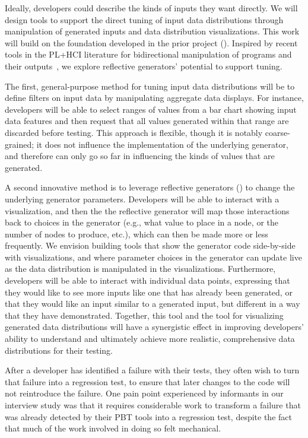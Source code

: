Ideally,
developers could describe the kinds of inputs they want directly.
We will design tools to support the direct tuning of input data distributions
through manipulation of generated inputs and data distribution visualizations. This
work will build on the foundation developed in the prior project
(). Inspired by recent tools in the PL+HCI literature
for bidirectional manipulation of programs and their
outputs~\cite{ref:hempel2019sketch,ref:kery2020mage,ref:omar2012active,ref:omar2021filling},
we explore reflective generators' potential to support tuning.

The first, general-purpose method for tuning input data distributions will be to
define filters on input data by manipulating aggregate data displays.
For instance, developers will be able to select ranges of values from a bar
chart showing input data features and then request that all values generated
within that range are discarded before testing. This approach is flexible,
though it is notably coarse-grained;
it does not influence the implementation of the underlying generator, and
therefore can only go so far in influencing the kinds of values that are
generated.

A second innovative method is to leverage
reflective generators () to change the underlying
generator parameters. Developers will be able to interact with a visualization,
and then the the reflective generator will map those interactions
back to choices
in the generator (e.g., what value to place in a node, or the number of nodes to
produce, etc.), which can then be made more or less frequently. We envision
building tools that show the generator code
side-by-side with visualizations, and where parameter choices in the generator
can update live as the data distribution is manipulated in the visualizations.
Furthermore, developers will be able to interact with individual data points,
expressing that they would like to see more inputs like one that has already
been generated, or that they would like an input similar to a generated input,
but different in a way that they have demonstrated. Together, this tool and the
tool for visualizing generated data distributions will have a synergistic effect
in improving developers' ability to understand and ultimately achieve more
realistic, comprehensive data distributions for their testing.

%
After a developer has identified a failure with their tests, they
often wish to turn that failure into a regression test, to ensure that later
changes to the code will not reintroduce the failure. One pain point experienced
by informants in our interview study was that it requires considerable work to
transform a failure that was already detected by their PBT tools into a
regression test, despite the fact that much of the work involved in doing so
felt mechanical.

